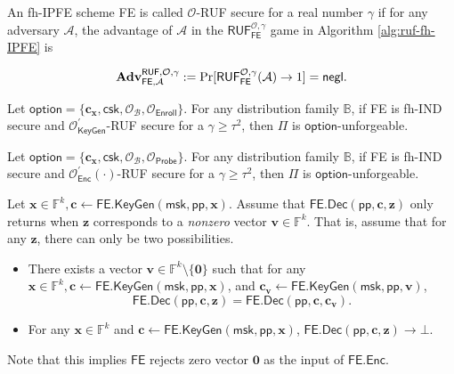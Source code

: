 \begin{definition}

	An fh-IPFE scheme \textsf{FE} is called $\mathcal{O}$-RUF secure for a real number $\gamma$ if for any adversary $\mathcal{A}$, the advantage of $\mathcal{A}$ in the $\textsf{RUF}^{\mathcal{O}, \gamma}_\textsf{FE}$ game in Algorithm \ref{alg:ruf-fh-IPFE} is

\[
	\mathbf{Adv}_{\textsf{FE}, \mathcal{A}}^{\textsf{RUF}, \mathcal{O}, \gamma} := \Pr[\textsf{RUF}^{\mathcal{O}, \gamma}_{\textsf{FE}}(\mathcal{A}) \to 1 ] = \mathsf{negl}.
\]

\end{definition}

\begin{theorem}
	Let $\textsf{option} = \{ \mathbf{c_x}, \textsf{csk}, \mathcal{O}_\mathcal{B}, \mathcal{O}_{\textsf{Enroll}} \}$. For any distribution family $\mathbb{B}$, if \textsf{FE} is fh-IND secure and $\mathcal{O}^\prime_{\textsf{KeyGen}}$-RUF secure for a $\gamma \geq \tau^2$, then $\Pi$ is $\textsf{option}$-unforgeable. 
\end{theorem}


\begin{theorem}
	Let $\textsf{option} = \{\mathbf{c_x}, \textsf{csk}, \mathcal{O}_\mathcal{B}, \mathcal{O}_\textsf{Probe}\}$. For any distribution family $\mathbb{B}$, if \textsf{FE} is fh-IND secure and $\mathcal{O}^\prime_{\textsf{Enc}}(\cdot)$-RUF secure for a $\gamma \geq \tau^2$, then $\Pi$ is $\textsf{option}$-unforgeable. 
\end{theorem}




\begin{assumption}
\label{assump}
Let $\mathbf{x} \in \mathbb{F}^k, \mathbf{c} \gets \textsf{FE.KeyGen}(\textsf{msk}, \textsf{pp}, \mathbf{x})$. Assume that $\textsf{FE.Dec}(\textsf{pp}, \mathbf{c}, \mathbf{z})$ only returns when $\mathbf{z}$ corresponds to a \emph{nonzero} vector $\mathbf{v} \in \mathbb{F}^k$. That is, assume that for any $\mathbf{z}$, there can only be two possibilities.

\begin{itemize}
	\item There exists a vector $\mathbf{v} \in \mathbb{F}^k \setminus \{\mathbf{0}\}$ such that for any $\mathbf{x} \in \mathbb{F}^k, \mathbf{c} \gets \textsf{FE.KeyGen}(\textsf{msk}, \textsf{pp}, \mathbf{x})$, and $\mathbf{c_v} \gets \textsf{FE.KeyGen}(\textsf{msk}, \textsf{pp}, \mathbf{v})$, 
	\[
		\textsf{FE.Dec}(\textsf{pp}, \mathbf{c}, \mathbf{z}) = \textsf{FE.Dec}(\textsf{pp}, \mathbf{c}, \mathbf{c_v}).
	\]
	\item For any $\mathbf{x} \in \mathbb{F}^k$ and $ \mathbf{c} \gets \textsf{FE.KeyGen}(\textsf{msk}, \textsf{pp}, \mathbf{x})$, $\textsf{FE.Dec}(\textsf{pp}, \mathbf{c}, \mathbf{z}) \to \bot$.

\end{itemize}
Note that this implies $\textsf{FE}$ rejects zero vector $\mathbf{0}$ as the input of $\textsf{FE.Enc}$.
\end{assumption}


